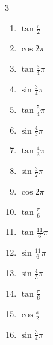 \begin{multicols}{3}
\begin{enumerate}
  \item $\displaystyle \tan{\frac{\pi}{2}}$
        \phantom{$\displaystyle \quad なし$}

  \item $\displaystyle \cos{2\pi}$
        \phantom{$\displaystyle =1$}

  \item $\displaystyle \tan{\frac{3}{4}\pi}$
        \phantom{$\displaystyle =-1$}

  \item $\displaystyle \sin{\frac{3}{4}\pi}$

  \item $\displaystyle \tan{\frac{5}{4}\pi}$
        \phantom{$\displaystyle =1$}

  \item $\displaystyle \sin{\frac{4}{3}\pi}$

  \item $\displaystyle \tan{\frac{4}{3}\pi}$

  \item $\displaystyle \sin{\frac{3}{2}\pi}$
        \phantom{$\displaystyle =-1$}

  \item $\displaystyle \cos{2\pi}$
        \phantom{$\displaystyle =1$}

  \item $\displaystyle \tan{\frac{\pi}{6}}$

  \item $\displaystyle \tan{\frac{11}{6}\pi}$

  \item $\displaystyle \sin{\frac{11}{6}\pi}$

  \item $\displaystyle \sin{\frac{4}{3}\pi}$

  \item $\displaystyle \tan{\frac{\pi}{6}}$

  \item $\displaystyle \cos{\frac{\pi}{2}}$
        \phantom{$\displaystyle =0$}

  \item $\displaystyle \sin{\frac{3}{4}\pi}$


\end{enumerate}
\end{multicols}
